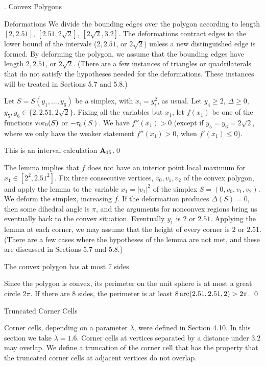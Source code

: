 \vfill\eject
\head {}. Convex Polygons\endhead

\subhead{} Deformations\endsubhead
We divide the bounding edges over the polygon according to
length $[2,2.51]$, $[2.51,2\sqrt{2}]$, $[2\sqrt{2},3.2]$.
The deformations contract edges to the lower bound
of the intervals ($2,2.51$, or $2\sqrt{2}$) unless a new
distinguished edge is formed.  By deforming the polygon,
we assume that the
bounding edges have length $2,2.51$, or $2\sqrt{2}$. 
(There are a few instances of triangles or quadrilaterals
that do not satisfy the hypotheses needed for the deformations.
These instances will be treated in Sections 5.7 and 5.8.)

  Let $S=S(y_1,\ldots,y_6)$ be a simplex,
with $x_i=y_i^2$, as usual.  Let $y_4\ge 2$, $\Delta\ge0$,
$y_5,y_6\in\{2,2.51,2\sqrt{2}\}$.  Fixing all the variables but $x_1$,
let $f(x_1)$ be one of
the functions $\operatorname{vor}_0(S)$ or $-\tau_0(S)$. We have
$f''(x_1)>0$  (except if $y_5=y_6=2\sqrt{2}$,
where we only have the weaker statement  $f''(x_1)>0$, when
$f'(x_1)\le0$).
\endproclaim

 This is an interval calculation ${\bold A}_{15}$.\qed\enddemo

The lemma implies that $f$ does not have an interior point
local maximum for
$x_1\in[2^2,2.51^2]$.  Fix three consecutive
vertices, $v_0,v_1,v_2$  of the convex polygon, 
and apply the lemma to the
variable $x_1 = |v_1|^2$ of the simplex $S=(0,v_0,v_1,v_2)$.  
 We deform the simplex,
increasing $f$.  If the deformation produces $\Delta(S)=0$, 
then some
dihedral angle is $\pi$, and the arguments for nonconvex
regions bring us eventually back to the convex situation.
Eventually $y_1$ is $2$ or $2.51$.  Applying the lemma at
each corner, we may assume that the height of every corner
is $2$ or $2.51$.   (There are a few cases where the hypotheses
of the lemma are not met, and these are discussed in Sections 5.7 and 5.8.)

 The convex polygon has at most $7$ sides.
\endproclaim

  Since the polygon is convex, its perimeter on the
unit sphere is
at most a great circle $2\pi$.  If there are $8$ sides, the
perimeter is at least $8\operatorname{arc}(2.51,2.51,2)>2\pi$.
\qed
\enddemo

\subhead {} Truncated Corner Cells\endsubhead

Corner cells, depending on a parameter $\lambda$,  
were defined in Section 4.10. 
In this section we take $\lambda=1.6$.  Corner cells at vertices separated
by a distance under $3.2$ may overlap.  We define a truncation of
the corner cell that has the property that the truncated corner cells
at adjacent vertices do not overlap.

